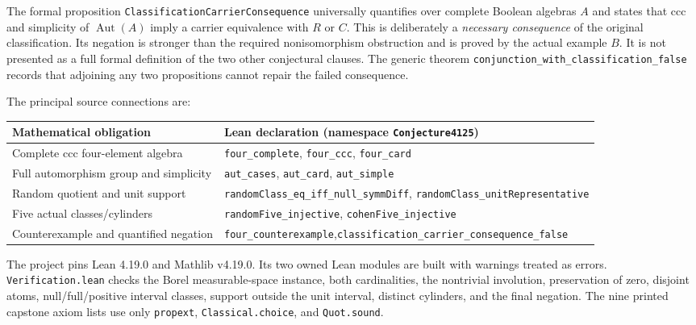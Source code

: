\documentclass[11pt]{article}
\newcommand{\Aut}{\operatorname{Aut}}
\begin{document}
The formal proposition \texttt{ClassificationCarrierConsequence} universally quantifies over complete Boolean algebras $A$ and states that ccc and simplicity of $\Aut(A)$ imply a carrier equivalence with $R$ or $C$. This is deliberately a \emph{necessary consequence} of the original classification. Its negation is stronger than the required nonisomorphism obstruction and is proved by the actual example $B$. It is not presented as a full formal definition of the two other conjectural clauses. The generic theorem \texttt{conjunction\_with\_classification\_false} records that adjoining any two propositions cannot repair the failed consequence.

The principal source connections are:
\begin{center}
\small
\begin{tabular}{@{}>{\raggedright\arraybackslash}p{}>{\raggedright\arraybackslash}p{}@{}}
\toprule
Mathematical obligation & Lean declaration (namespace \texttt{Conjecture4125})\\
\midrule
Complete ccc four-element algebra & \texttt{four\_complete}, \texttt{four\_ccc}, \texttt{four\_card}\\
Full automorphism group and simplicity & \texttt{aut\_cases}, \texttt{aut\_card}, \texttt{aut\_simple}\\
Random quotient and unit support & \texttt{randomClass\_eq\_iff\_null\_symmDiff}, \texttt{randomClass\_unitRepresentative}\\
Five actual classes/cylinders & \texttt{randomFive\_injective}, \texttt{cohenFive\_injective}\\
Counterexample and quantified negation & \texttt{four\_counterexample},\newline \texttt{classification\_carrier\_consequence\_false}\\
\bottomrule
\end{tabular}
\end{center}

The project pins Lean 4.19.0 and Mathlib v4.19.0. Its two owned Lean modules are built with warnings treated as errors. \texttt{Verification.lean} checks the Borel measurable-space instance, both cardinalities, the nontrivial involution, preservation of zero, disjoint atoms, null/full/positive interval classes, support outside the unit interval, distinct cylinders, and the final negation. The nine printed capstone axiom lists use only \texttt{propext}, \texttt{Classical.choice}, and \texttt{Quot.sound}.
\end{document}
